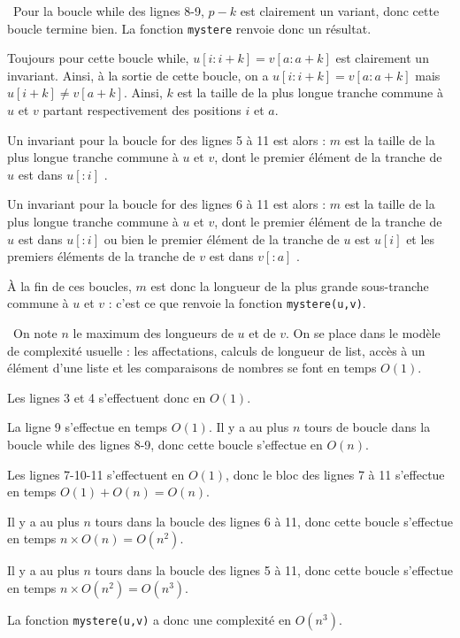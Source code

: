 \question\ Pour la boucle while des lignes 8-9, $p-k$ est clairement un variant, donc cette boucle termine bien. La fonction \texttt{mystere} renvoie donc un résultat. 

  Toujours pour cette boucle while, \og $u[i:i+k] = v[a:a+k]$ \fg{} est clairement un invariant. Ainsi, à la sortie de cette boucle, on a $u[i:i+k] = v[a:a+k]$ mais $u[i+k] \neq v[a+k]$. 
  Ainsi, $k$ est la taille de la plus longue tranche commune à $u$ et $v$ partant respectivement des positions $i$ et $a$. 
  
  Un invariant pour la boucle for des lignes 5 à 11 est alors : \og $m$ est la taille de la plus longue tranche commune à $u$ et $v$, dont le premier élément de la tranche de $u$ est dans $u[:i]$ \fg. 
  
  Un invariant pour la boucle for des lignes 6 à 11 est alors : \og $m$ est la taille de la plus longue tranche commune à $u$ et $v$, dont le premier élément de la tranche de $u$ est dans $u[:i]$ ou bien le premier élément de la tranche de $u$ est $u[i]$ et les premiers éléments de la tranche de $v$ est dans $v[:a]$ \fg. 
  
  À la fin de ces boucles, $m$ est donc la longueur de la plus grande sous-tranche commune à $u$ et $v$ : c'est ce que renvoie la fonction \texttt{mystere(u,v)}. 
  
\question\ On note $n$ le maximum des longueurs de $u$ et de $v$. 
  On se place dans le modèle de complexité usuelle : les affectations, calculs de longueur de list, accès à un élément d'une liste et les comparaisons de nombres se font en temps $O(1)$.
  
  Les lignes 3 et 4 s'effectuent donc en $O(1)$.
  
  La ligne 9 s'effectue en temps $O(1)$. Il y a au plus $n$ tours de boucle dans la boucle while des lignes 8-9, donc cette boucle s'effectue en $O(n)$. 
  
  Les lignes 7-10-11 s'effectuent en $O(1)$, donc le bloc des lignes 7 à 11 s'effectue en temps $O(1) + O(n) = O(n)$. 
  
  Il y a au plus $n$ tours dans la boucle des lignes 6 à 11, donc cette boucle s'effectue en temps $n \times O(n) = O(n^2)$. 
  
  Il y a au plus $n$ tours dans la boucle des lignes 5 à 11, donc cette boucle s'effectue en temps $n \times O(n^2) = O(n^3)$.
  
  La fonction \texttt{mystere(u,v)} a donc une complexité en $O(n^3)$.